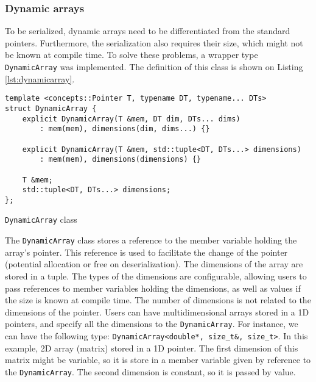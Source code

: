 \subsubsection{Dynamic arrays}

To be serialized, dynamic arrays need to be differentiated from the standard
pointers. Furthermore, the serialization also requires their size, which might
not be known at compile time. To solve these problems, a wrapper type
\texttt{DynamicArray} was implemented. The definition of this class is shown on
Listing \ref{lst:dynamicarray}.

\begin{listing}[ht!]
\begin{verbatim}
template <concepts::Pointer T, typename DT, typename... DTs>
struct DynamicArray {
    explicit DynamicArray(T &mem, DT dim, DTs... dims)
        : mem(mem), dimensions(dim, dims...) {}

    explicit DynamicArray(T &mem, std::tuple<DT, DTs...> dimensions)
        : mem(mem), dimensions(dimensions) {}

    T &mem;
    std::tuple<DT, DTs...> dimensions;
};
\end{verbatim}
\caption{\texttt{DynamicArray} class}
\label{lst:dynamicarray}
\end{listing}

The \texttt{DynamicArray} class stores a reference to the member variable
holding the array's pointer. This reference is used to facilitate the change of
the pointer (potential allocation or free on deserialization). The dimensions of
the array are stored in a tuple. The types of the dimensions are configurable,
allowing users to pass references to member variables holding the dimensions, as
well as values if the size is known at compile time. The number of dimensions is
not related to the dimensions of the pointer. Users can have multidimensional
arrays stored in a 1D pointers, and specify all the dimensions to the
\texttt{DynamicArray}. For instance, we can have the following type:
\texttt{DynamicArray<double*, size\_t\&, size\_t>}. In this example,   2D array
(matrix) stored in a 1D pointer. The first dimension of this matrix might be
variable, so it is store in a member variable given by reference to the
\texttt{DynamicArray}. The second dimension is constant, so it is passed by
value.

